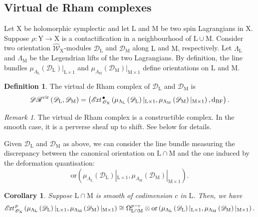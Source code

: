 \documentclass{article}
\theoremstyle{plain}
\newtheorem{corollary}[theorem]{Corollary}
\theoremstyle{definition}
\newtheorem{definition}[theorem]{Definition}
\theoremstyle{remark}
\newtheorem{remark}[theorem]{Remark}
\newcommand{\mr}{\mathrm}
\newcommand{\3}{\vspace{3mm}}
\newcommand{\2}{\vspace{2mm}}
\newcommand{\1}{\vspace{1mm}}
\newcommand*{\ext}{\mathscr{E}\text{\kern -1.5pt {\it{xt}}}\,}
\begin{document}
\subsection{Virtual de Rham complexes}\label{vdrsec}
Let $\mr{X}$ be holomorphic symplectic and let $\mr{L}$ and $\mr{M}$ be two spin Lagrangians in $\mr{X}$. Suppose $\rho : \mr{Y} \to \mr{X}$ is a contactification in a neighbourhood of $\mr{L}\cup \mr{M}$. Consider two orientation $\widehat{\mathscr{W}}_\mr{X}$-modules $\mathscr{D}_{\mr{L}}$ and $\mathscr{D}_{\mr{M}}$ along $\mr{L}$ and $\mr{M}$, respectively. Let $\Lambda_\mr{L}$ and $\Lambda_\mr{M}$ be the Legendrian lifts of the two Lagrangians. By definition, the line bundles $\mu_{\Lambda_\mr{L}}\left(\mathscr{D}_\mr{L}\right)|_{\mr{L}\times 1}$ and $\mu_{\Lambda_\mr{M}}\left(\mathscr{D}_\mr{M}\right)|_{\mr{M}\times 1}$ define orientations on $\mr{L}$ and $\mr{M}$.
\2
\begin{definition}\label{virdr}
The virtual de Rham complex of $\mathscr{D}_\mr{L}$ and $\mathscr{D}_\mr{M}$ is $$\mathscr{DR}^\mr{vir}\left(\mathscr{D}_\mr{L},\mathscr{D}_\mr{M}\right)=\left(\ext_{\mathscr{O}_\mr{X}}^\bullet\left(\mu_{\Lambda_\mr{L}}\left(\mathscr{D}_\mr{L}\right)|_{\mr{L}\times 1},\mu_{\Lambda_\mr{M}}\left(\mathscr{D}_\mr{M}\right)|_{\mr{M}\times 1}\right),\mr{d}_{\mr{BF}}\right).$$
\end{definition} 
\2
\begin{remark}
The virtual de Rham complex is a constructible complex. In the smooth case, it is a perverse sheaf up to shift. See below for details.
\end{remark}
Given $\mathscr{D}_\mr{L}$ and $\mathscr{D}_\mr{M}$ as above, we can consider the line bundle measuring the discrepancy between the canonical orientation on $\mr{L\cap M}$ and the one induced by the deformation quantisation: $$\mr{or}\left(\mu_{\Lambda_\mr{L}}\left(\mathscr{D}_\mr{L}\right)|_{\mr{L}\times 1},\mu_{\Lambda_\mr{M}}\left(\mathscr{D}_\mr{M}\right)|_{\mr{M}\times 1}\right).$$
\begin{corollary}
Suppose $\mr{L}\cap\mr{M}$ is smooth of codimension $c$ in $\mr{L}$. Then, we have $$\ext_{\mathscr{O}_\mr{X}}^p\left(\mu_{\Lambda_\mr{L}}\left(\mathscr{D}_\mr{L}\right)|_{\mr{L}\times 1},\mu_{\Lambda_\mr{M}}\left(\mathscr{D}_\mr{M}\right)|_{\mr{M}\times 1}\right)\cong \Omega^{p-c}_{\mr{L}\cap\mr{M}}\otimes \mr{or}\left(\mu_{\Lambda_\mr{L}}\left(\mathscr{D}_\mr{L}\right)|_{\mr{L}\times 1},\mu_{\Lambda_\mr{M}}\left(\mathscr{D}_\mr{M}\right)|_{\mr{M}\times 1}\right).$$
\end{corollary} 
\end{document}
